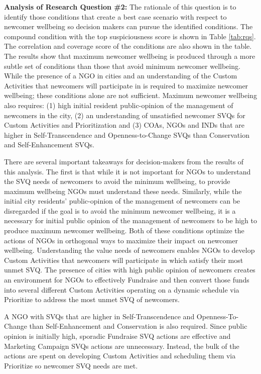 \documentclass{scspaperproc}
\theoremstyle{scsthe}
\begin{document}
{\bf Analysis of Research Question \#2:} The rationale of this question is to identify those conditions that create a best case scenario with respect to newcomer wellbeing so decision makers can pursue the identified conditions. The compound condition with the top suspiciousness score is shown in Table \ref{tab:rqs}. The correlation and coverage score of the conditions are also shown in the table. The results show that maximum newcomer wellbeing is produced through a more subtle set of conditions than those that avoid minimum newcomer wellbeing. While the presence of a NGO in cities and an understanding of the Custom Activities that newcomers will participate in is required to maximize newcomer wellbeing; these conditions alone are not sufficient. Maximum newcomer wellbeing also requires: (1) high initial resident public-opinion of the management of newcomers in the city, (2) an understanding of unsatisfied newcomer SVQs for Custom Activities and Prioritization and (3) COAs, NGOs and INDs that are higher in Self-Transcendence and Openness-to-Change SVQs than Conservation and Self-Enhancement SVQs.

There are several important takeaways for decision-makers from the results of this analysis. The first is that while it is not important for NGOs to understand the SVQ needs of newcomers to avoid the minimum wellbeing, to provide maximum wellbeing NGOs must understand these needs. Similarly, while the initial city residents' public-opinion of the management of newcomers can be disregarded if the goal is to avoid the minimum newcomer wellbeing, it is a necessary for initial public opinion of the management of newcomers to be high to produce maximum newcomer wellbeing. Both of these conditions optimize the actions of NGOs in orthogonal ways to maximize their impact on newcomer wellbeing. Understanding the value needs of newcomers enables NGOs to develop Custom Activities that newcomers will participate in which satisfy their most unmet SVQ. The presence of cities with high public opinion of newcomers creates an environment for NGOs to effectively Fundraise and then convert those funds into several different Custom Activities operating on a dynamic schedule via Prioritize to address the most unmet SVQ of newcomers. 

A NGO with SVQs that are higher in Self-Transcendence and Openness-To-Change than Self-Enhancement and Conservation is also required. Since public opinion is initially high, sporadic Fundraise SVQ actions are effective and Marketing Campaign SVQs actions are unnecessary. Instead, the bulk of the actions are spent on developing Custom Activities and scheduling them via Prioritize so newcomer SVQ needs are met. 
\end{document}
